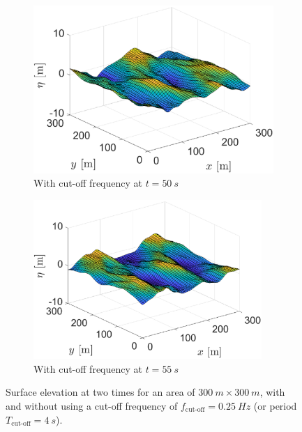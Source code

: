 \begin{figure}[htb]
\begin{subfigure}[t]{.5\textwidth}
    \includegraphics[width=.95\textwidth,trim=0cm 0cm 0.0cm 0cm, clip=true]{Figures/Plots/etadir1.eps}
    \caption{With cut-off frequency at $t=\SI{50}{s}$}
    \label{fig:etaIFFTdir1}
\end{subfigure}%
\begin{subfigure}[t]{.5\textwidth}
    \centering
    \includegraphics[width=0.95\textwidth,trim=0cm 0cm 0cm 0cm, clip=true]{Figures/Plots/etadir2.eps}
    \caption{With cut-off frequency at $t=\SI{55}{s}$}
    \label{fig:etaIFFTdir2}
\end{subfigure}
\caption{Surface elevation at two times for an area of $\SI{300}{m}\times\SI{300}{m}$, with and without using a cut-off frequency of $f_{\text{cut-off}}=\SI{0.25}{Hz}$ (or period $T_{\text{cut-off}}=\SI{4}{s}$).}
\label{fig:etaIFFTdirection}
\end{figure}